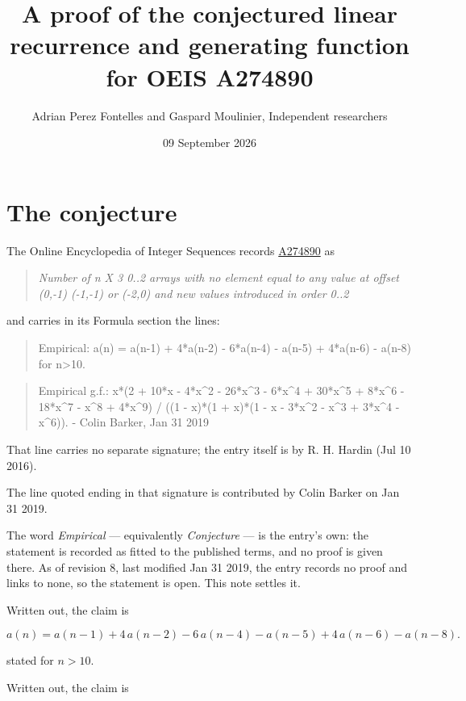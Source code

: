 \documentclass[11pt]{article}
\title{A proof of the conjectured linear recurrence and generating function for OEIS A274890}
\author{Adrian Perez Fontelles and Gaspard Moulinier, Independent researchers}
\date{09 September 2026}
\theoremstyle{definition}
\begin{document}
\maketitle
\section{The conjecture}

The Online Encyclopedia of Integer Sequences records \href{https://oeis.org/A274890}{A274890} as

\begin{quote}\itshape Number of n X 3 0..2 arrays with no element equal to any value at offset (0,-1) (-1,-1) or (-2,0) and new values introduced in order 0..2\end{quote}

and carries in its Formula section the lines:

\begin{quote}\ttfamily Empirical: a(n) = a(n-1) + 4*a(n-2) - 6*a(n-4) - a(n-5) + 4*a(n-6) - a(n-8) for n>10.\end{quote}

\begin{quote}\ttfamily Empirical g.f.: x*(2 + 10*x - 4*x\textasciicircum{}2 - 26*x\textasciicircum{}3 - 6*x\textasciicircum{}4 + 30*x\textasciicircum{}5 + 8*x\textasciicircum{}6 - 18*x\textasciicircum{}7 - x\textasciicircum{}8 + 4*x\textasciicircum{}9) / ((1 - x)*(1 + x)*(1 - x - 3*x\textasciicircum{}2 - x\textasciicircum{}3 + 3*x\textasciicircum{}4 - x\textasciicircum{}6)). - Colin Barker, Jan 31 2019\end{quote}

That line carries no separate signature; the entry itself is by R. H. Hardin (Jul 10 2016).

The line quoted ending in that signature is contributed by Colin Barker on Jan 31 2019.

The word {\itshape Empirical} --- equivalently {\itshape Conjecture} --- is the entry's own: the statement is recorded as fitted to the published terms, and no proof is given there. As of revision 8, last modified Jan 31 2019, the entry records no proof and links to none, so the statement is open. This note settles it.

Written out, the claim is

\[a(n) = a(n-1) + 4\,a(n-2) - 6\,a(n-4) - a(n-5) + 4\,a(n-6) - a(n-8).\]

stated for $n > 10$.

Written out, the claim is
\end{document}
